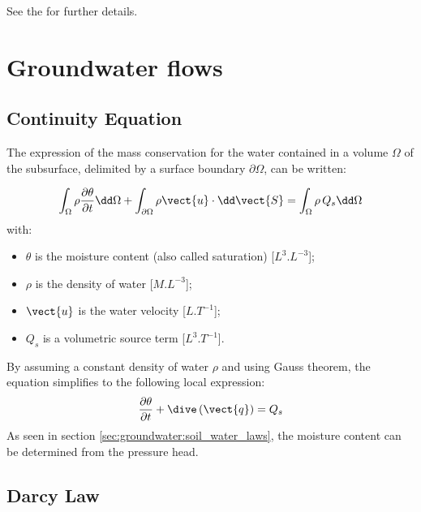 See the  for further details.

\section{Groundwater flows}

\subsection{Continuity Equation}

The expression of the mass conservation for the water contained in a volume $\Omega$ of
the subsurface, delimited by a surface boundary $\partial \Omega$,
can be written:

\begin{equation}\label{eq:groundwater:int_mass_cons}
\int_\Omega{\rho \frac{\partial{\theta}}{\partial{t}} \dd \Omega} + \int_{\partial \Omega}{ \rho \vect{u}\cdot  \dd \vect{S}}=
\int_\Omega{\rho\,Q_s \dd \Omega}
\end{equation}
with:
\begin {itemize}
 \item[$\bullet$] $\theta$ is the moisture content (also called saturation) [$L^3.L^{-3}$];
 \item[$\bullet$] $\rho$ is the density of water [$M.L^{-3}$];
 \item[$\bullet$] $\vect{u}$ is the water velocity [$L.T^{-1}$];
 \item[$\bullet$] $Q_s$ is a volumetric source term [$L^3.T^{-1}$].
\end{itemize}

By assuming a constant density of water $\rho$ and using Gauss theorem, the equation simplifies to the following local expression:
\begin{equation}\label{eq:groundwater:mass_cons}
\frac{\partial{\theta}}{\partial{t}} + \dive \left( \vect{q} \right) = Q_s
\end{equation}
As seen in section \ref{sec:groundwater:soil_water_laws}, the moisture content can be determined from the pressure head.

\subsection{Darcy Law}\label{sec:groundwater:darcy_law}

